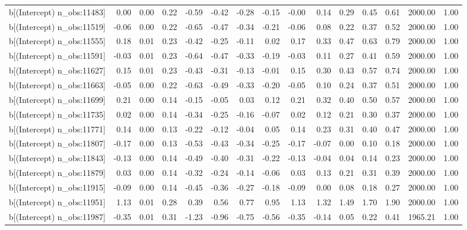 \begin{table}[ht]
\begin{tabular}{rrrrrrrrrrrrrrr}
  b[(Intercept) n\_obs:11483] & 0.00 & 0.00 & 0.22 & -0.59 & -0.42 & -0.28 & -0.15 & -0.00 & 0.14 & 0.29 & 0.45 & 0.61 & 2000.00 & 1.00 \\ 
  b[(Intercept) n\_obs:11519] & -0.06 & 0.00 & 0.22 & -0.65 & -0.47 & -0.34 & -0.21 & -0.06 & 0.08 & 0.22 & 0.37 & 0.52 & 2000.00 & 1.00 \\ 
  b[(Intercept) n\_obs:11555] & 0.18 & 0.01 & 0.23 & -0.42 & -0.25 & -0.11 & 0.02 & 0.17 & 0.33 & 0.47 & 0.63 & 0.79 & 2000.00 & 1.00 \\ 
  b[(Intercept) n\_obs:11591] & -0.03 & 0.01 & 0.23 & -0.64 & -0.47 & -0.33 & -0.19 & -0.03 & 0.11 & 0.27 & 0.41 & 0.59 & 2000.00 & 1.00 \\ 
  b[(Intercept) n\_obs:11627] & 0.15 & 0.01 & 0.23 & -0.43 & -0.31 & -0.13 & -0.01 & 0.15 & 0.30 & 0.43 & 0.57 & 0.74 & 2000.00 & 1.00 \\ 
  b[(Intercept) n\_obs:11663] & -0.05 & 0.00 & 0.22 & -0.63 & -0.49 & -0.33 & -0.20 & -0.05 & 0.10 & 0.24 & 0.37 & 0.51 & 2000.00 & 1.00 \\ 
  b[(Intercept) n\_obs:11699] & 0.21 & 0.00 & 0.14 & -0.15 & -0.05 & 0.03 & 0.12 & 0.21 & 0.32 & 0.40 & 0.50 & 0.57 & 2000.00 & 1.00 \\ 
  b[(Intercept) n\_obs:11735] & 0.02 & 0.00 & 0.14 & -0.34 & -0.25 & -0.16 & -0.07 & 0.02 & 0.12 & 0.21 & 0.30 & 0.37 & 2000.00 & 1.00 \\ 
  b[(Intercept) n\_obs:11771] & 0.14 & 0.00 & 0.13 & -0.22 & -0.12 & -0.04 & 0.05 & 0.14 & 0.23 & 0.31 & 0.40 & 0.47 & 2000.00 & 1.00 \\ 
  b[(Intercept) n\_obs:11807] & -0.17 & 0.00 & 0.13 & -0.53 & -0.43 & -0.34 & -0.25 & -0.17 & -0.07 & 0.00 & 0.10 & 0.18 & 2000.00 & 1.00 \\ 
  b[(Intercept) n\_obs:11843] & -0.13 & 0.00 & 0.14 & -0.49 & -0.40 & -0.31 & -0.22 & -0.13 & -0.04 & 0.04 & 0.14 & 0.23 & 2000.00 & 1.00 \\ 
  b[(Intercept) n\_obs:11879] & 0.03 & 0.00 & 0.14 & -0.32 & -0.24 & -0.14 & -0.06 & 0.03 & 0.13 & 0.21 & 0.31 & 0.39 & 2000.00 & 1.00 \\ 
  b[(Intercept) n\_obs:11915] & -0.09 & 0.00 & 0.14 & -0.45 & -0.36 & -0.27 & -0.18 & -0.09 & 0.00 & 0.08 & 0.18 & 0.27 & 2000.00 & 1.00 \\ 
  b[(Intercept) n\_obs:11951] & 1.13 & 0.01 & 0.28 & 0.39 & 0.56 & 0.77 & 0.95 & 1.13 & 1.32 & 1.49 & 1.70 & 1.90 & 2000.00 & 1.00 \\ 
  b[(Intercept) n\_obs:11987] & -0.35 & 0.01 & 0.31 & -1.23 & -0.96 & -0.75 & -0.56 & -0.35 & -0.14 & 0.05 & 0.22 & 0.41 & 1965.21 & 1.00 \\ 

\end{tabular}
\end{table}
